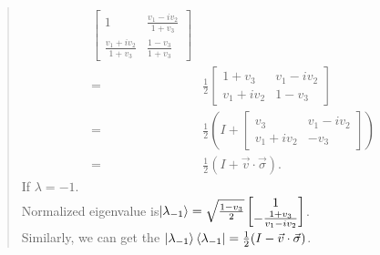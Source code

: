 \documentclass[UTF8]{ctexart}
\begin{document}
\begin{quote}
\begin{equation}
\begin{aligned}
\begin{bmatrix}
				1 & \frac{v_{1}-iv_{2}}{1+v_{3}}\\
				\frac{v_{1}+iv_{2}}{1+v_{3}} & \frac{1-v_{3}}{1+v_{3}} 
			\end{bmatrix}\\
			=&\frac{1}{2}\begin{bmatrix}
				1+v_{3} & v_{1}-iv_{2} \\ v_{1}+iv_{2} & 1-v_{3}
			\end{bmatrix}\\
			=& \frac{1}{2}\left(I+\begin{bmatrix}
				v_{3} & v_{1}-iv_{2} \\v_{1}+iv_{2} & -v_{3}
			\end{bmatrix}\right)\\
			=& \frac{1}{2}(I+\vec{v}\cdot\vec{\sigma}).
		\end{aligned}
	\end{equation}
	If $\lambda=-1$. \\
	Normalized eigenvalue is$\ket{\lambda_{-1}}=\sqrt{\frac{1-v_{3}}{2}}\begin{bmatrix}
		1 \\ -\frac{1+v_{3}}{v_{1}-iv_{2}}
	\end{bmatrix}$. \\
	Similarly, we can get the $\ket{\lambda_{-1}}\bra{\lambda_{-1}}=\frac{1}{2}(I-\vec{v}\cdot\vec{\sigma})$.
\end{quote}
\end{document}
